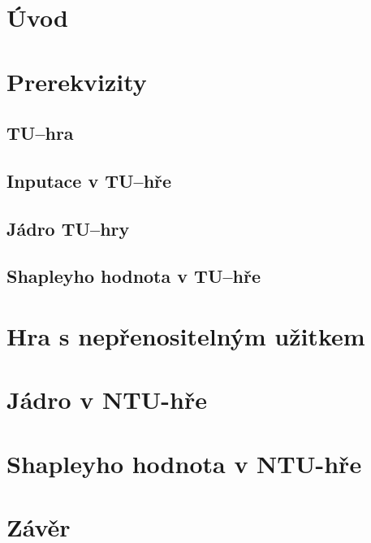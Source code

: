 \section{Úvod}
    \lipsum[1-2] \cite{ARMC}

\section{Prerekvizity}
    \lipsum[1]
    \subsection{TU--hra}
        \lipsum[1]
    \subsection{Inputace v TU--hře}
        \lipsum[1]
    \subsection{Jádro TU--hry}
        \lipsum[1]
    \subsection{Shapleyho hodnota v TU--hře}
        \lipsum[1]

\section{Hra s nepřenositelným užitkem}
    \lipsum[1]

\section{Jádro v NTU-hře}
    \lipsum[1]

\section{Shapleyho hodnota v NTU-hře}
    \lipsum[1]

\section{Závěr}
    \lipsum[1]
